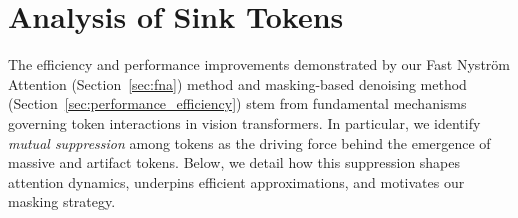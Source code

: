 \documentclass[10pt,twocolumn,letterpaper]{article}
\begin{document}
\begin{table}[t]
\centering
\footnotesize
\begin{subtable}[t]{\columnwidth}
\centering
{}
\caption{Image retrieval}
\label{tab:image_retrieval_sub}
\end{subtable}

\vspace{1em}

\begin{subtable}[t]{\columnwidth}
\centering
{}
\caption{Text retrieval}
\label{tab:text_retrieval_sub}
\end{subtable}
\vspace{-1em}
\caption{Zero-shot retrieval results for pretrained CLIP ViT L-14 on COCO \cite{chen2015coco} and Flickr30k \cite{young2014flickr} show performance gains from masking sink tokens at the final layers.}
\label{tab:combined_retrieval}
\end{table}





 \section{Analysis of Sink Tokens}
\label{sec:mechanisms}

The efficiency and performance improvements demonstrated by our Fast Nystr\"om Attention (Section~\ref{sec:fna}) method and masking-based denoising method (Section~\ref{sec:performance_efficiency}) stem from fundamental mechanisms governing token interactions in vision transformers. In particular, we identify \emph{mutual suppression} among tokens as the driving force behind the emergence of massive and artifact tokens. Below, we detail how this suppression shapes attention dynamics, underpins efficient approximations, and motivates our masking strategy.
\end{document}
